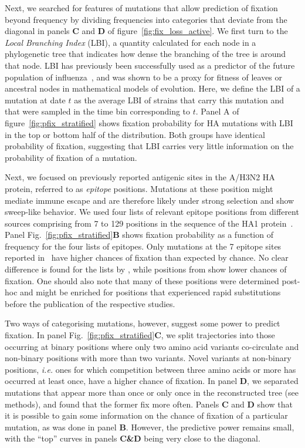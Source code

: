 \documentclass[reprint,amsmath,amssymb,superscriptaddress,showpacs,rmp]{revtex4-1}
\begin{document}
Next, we searched for features of mutations that allow prediction of fixation beyond frequency by dividing frequencies into categories that deviate from the diagonal in panels \textbf{C} and \textbf{D} of figure~\ref{fig:fix_loss_active}. 
We first turn to the \emph{Local Branching Index} (LBI), a quantity calculated for each node in a phylogenetic tree that indicates how dense the branching of the tree is around that node. 
LBI has previously been successfully used as a predictor of the future population of influenza~\cite{neher_predicting_2014}, and was shown to be a proxy for fitness of leaves or ancestral nodes in mathematical models of evolution. 
Here, we define the LBI of a mutation at date $t$ as the average LBI of strains that carry this mutation and that were sampled in the time bin corresponding to $t$. 
Panel A of figure~\ref{fig:pfix_stratified} shows fixation probability for HA mutations with LBI in the top or bottom half of the distribution. 
Both groups have identical probability of fixation, suggesting that LBI carries very little information on the probability of fixation of a mutation.

Next, we focused on previously reported antigenic sites in the A/H3N2 HA protein, referred to as \emph{epitope} positions. 
Mutations at these position might mediate immune escape and are therefore likely under strong selection and show sweep-like behavior. 
We used four lists of relevant epitope positions from different sources comprising from 7 to 129 positions in the sequence of the HA1 protein~\cite{Koel976, luksza_predictive_2014, Shih6283, wolf_long_2006}. 
Panel Fig.~\ref{fig:pfix_stratified}\textbf{B} shows fixation probability as a function of frequency for the four lists of epitopes. 
Only mutations at the 7 epitope sites reported in~\cite{Koel976} have higher chances of fixation than expected by chance. 
No clear difference is found for the lists by \citet{luksza_predictive_2014, wolf_long_2006}, while positions from \citet{Shih6283} show lower chances of fixation.
One should also note that many of these positions were determined post-hoc and might be enriched for positions that experienced rapid substitutions before the publication of the respective studies. 

Two ways of categorising mutations, however, suggest some power to predict fixation. 
In panel Fig.~\ref{fig:pfix_stratified}\textbf{C}, we split trajectories into those occurring at binary positions where only two amino acid variants co-circulate and non-binary positions with more than two variants. 
Novel variants at non-binary positions, \emph{i.e.} ones for which competition between three amino acids or more has occurred at least once, have a higher chance of fixation. 
In panel \textbf{D}, we separated mutations that appear more than once or only once in the reconstructed tree (see methods), and found that the former fix more often. 
Panels \textbf{C} and \textbf{D} show that it is possible to gain some information on the chance of fixation of a particular mutation, as was done in panel \textbf{B}. 
However, the predictive power remains small, with the ``top'' curves in panels \textbf{C\&D} being very close to the diagonal. 
\end{document}
